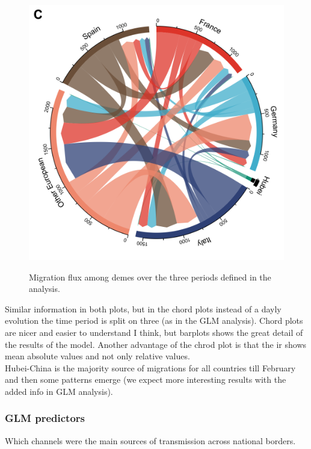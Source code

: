 \documentclass[12pt,]{article}
\begin{document}
\begin{figure}[!tbp]
\begin{minipage}[t]{0.4\textwidth}
  \label{fig:migs2}
  \end{minipage}
  \begin{minipage}[t]{0.4\textwidth}
  \includegraphics[width=\textwidth]{201014_europe2_figtraj08c.png}
  \label{fig:migs3}
  \end{minipage}
  \caption{Migration flux among demes over the three periods defined in the analysis.}
  \label{fig:migs}
\end{figure}


Similar information in both plots, but in the chord plots instead of a dayly evolution the time period is split on three (as in the GLM analysis). Chord plots are nicer and easier to understand I think, but barplots shows the great detail of the results of the model. Another advantage of the chrod plot is that the ir shows mean absolute values and not only relative values.\\

Hubei-China is the majority source of migrations for all countries till February and then some patterns emerge (we expect more interesting results with the added info in GLM analysis).\\



\subsubsection*{GLM predictors}
Which channels were the main sources of transmission across national borders.
\end{document}
